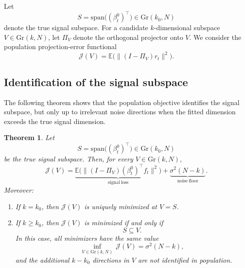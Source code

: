 \documentclass[11pt,letterpaper]{article}
\newcommand{\gr}{\mathrm{Gr}}
\newcommand{\cJ}{\mathcal{J}}
\newtheorem{theorem}{Theorem}[section]
\begin{document}
Let
\begin{equation}
\label{eq:true-signal-subspace}
S = \mathrm{span}\big((\beta_t^0)^\top\big) \in \gr(k_0,N)
\end{equation}
denote the true signal subspace. For a candidate $k$-dimensional subspace $V\in\gr(k,N)$, let $\Pi_V$ denote the orthogonal projector onto $V$. We consider the population projection-error functional
\begin{equation}
\label{eq:pop-functional}
\cJ(V) = \mathbb{E}\big(\|(I-\Pi_V)r_t\|^2\big).
\end{equation}

\subsection{Identification of the signal subspace}
\label{subsec:population-identification}

The following theorem shows that the population objective identifies the signal subspace, but only up to irrelevant noise directions when the fitted dimension exceeds the true signal dimension.

\begin{theorem}
\label{thm:pop-signal-subspace}
Let
\begin{equation*}
S=\mathrm{span}\big((\beta_t^0)^\top\big)\in\gr(k_0,N)
\end{equation*}
be the true signal subspace. Then, for every $V\in\gr(k,N)$,
\begin{equation}
\label{eq:pop-decomp}
\cJ(V)=\underbrace{\mathbb{E}\big(\|(I-\Pi_V)(\beta_t^0)^\top f_t\|^2\big)}_{\mathrm{signal\ loss}}
+ \underbrace{\sigma^2(N-k)}_{\mathrm{noise\ floor}}.
\end{equation}
Moreover:
\begin{enumerate}[label=(\roman*)]
\item If $k=k_0$, then $\cJ(V)$ is uniquely minimized at $V=S$.

\item If $k\geq k_0$, then $\cJ(V)$ is minimized if and only if
\begin{equation*}
S\subseteq V.
\end{equation*}
In this case, all minimizers have the same value
\begin{equation}
\label{eq:pop-minimum-value}
\inf_{V\in\gr(k,N)}\,\cJ(V)=\sigma^2(N-k),
\end{equation}
and the additional $k-k_0$ directions in $V$ are not identified in population.
\end{enumerate}
\end{theorem}
\end{document}
